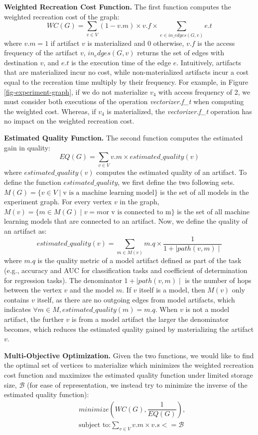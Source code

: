 \textbf{Weighted Recreation Cost Function.} 
The first function computes the weighted recreation cost of the graph:
\[
WC(G) =  \sum\limits_{v \in V}  (1-v.m) \times v.f \times \sum\limits_{e \in in\_edges(G,v)} e.t
\]
where $v.m = 1$ if artifact $v$ is materialized and $0$ otherwise, $v.f$ is the access frequency of the artifact $v$, $in_edges(G,v)$ returns the set of edges with destination $v$, and $e.t$ is the execution time of the edge $e$.
Intuitively, artifacts that are materialized incur no cost, while non-materialized artifacts incur a cost equal to the recreation time multiply by their frequency.
For example, in Figure \ref{fig-experiment-graph}, if we do not materialize $v_4$ with access frequency of 2, we must consider both executions of the operation \textit{vectorizer.f\_t}  when computing the weighted cost.
Whereas, if $v_4$ is materialized, the \textit{vectorizer.f\_t} operation has no impact on the weighted recreation cost.

\textbf{Estimated Quality Function.} 
The second function computes the estimated gain in quality:
\[
EQ(G) =  \sum\limits_{v \in V}  v.m \times estimated\_quality(v)
\]
where $estimated\_quality(v)$ computes the estimated quality of an artifact.
To define the function $estimated\_quality$, we first define the two following sets.
$M(G) = \{v \in V \mid \text{v is a machine learning model}\}$ is the set of all models in the experiment graph.
For every vertex $v$ in the graph, $M(v) = \{m \in M(G) \mid v = m \text{or v is connected to m}\}$ is the set of all machine learning models that are connected to an artifact.
Now, we define the quality of an artifact as:
\[
estimated\_quality(v) = \sum\limits_{m \in M(v)} m.q \times \dfrac{1}{1 + \mid path(v,m) \mid}
\]
where $m.q$ is the quality metric of a model artifact defined as part of the task (e.g., accuracy and AUC for classification tasks and coefficient of determination for regression tasks).
The denominator $1 + \mid path(v,m) \mid$ is the number of hops between the vertex $v$ and the model $m$.
If $v$ itself is a model, then $M(v)$ only contains $v$ itself, as there are no outgoing edges from model artifacts, which indicates $\forall m \in M, estimated\_quality(m) = m.q$.
When $v$ is not a model artifact, the further $v$ is from a model artifact the larger the denominator becomes, which reduces the estimated quality gained by materializing the artifact $v$.

\textbf{Multi-Objective Optimization.}
Given the two functions, we would like to find the optimal set of vertices to materialize which minimizes the weighted recreation cost function and maximizes the estimated quality function under limited storage size, $\mathcal{B}$ (for ease of representation, we instead try to minimize the inverse of the estimated quality function):
\begin{equation}
\begin{split}
& minimize(WC(G), \dfrac{1}{EQ(G)}), \\
& \text{subject to:} \sum\limits_{v \in V} v.m \times v.s <= \mathcal{B}
\end{split}
\end{equation}

